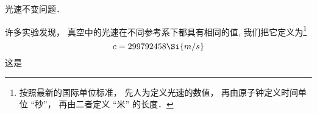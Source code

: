 
光速不变问题．

许多实验发现， 真空中的光速在不同参考系下都具有相同的值, 我们把它定义为\footnote{按照最新的国际单位标准， 先人为定义光速的数值， 再由原子钟定义时间单位 “秒”， 再由二者定义 “米” 的长度．}
\begin{equation}
c = 299792458\Si{m/s}
\end{equation}
这是
